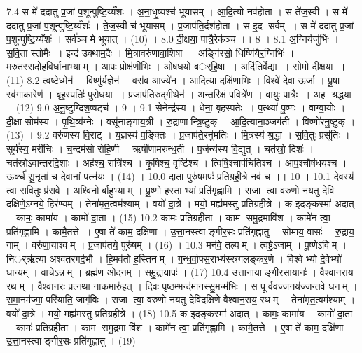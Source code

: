 7.4
स मे॑ ददातु प्र॒जां प॒शून्पुष्टि॒य्यँशः॑ । अ॒ना॒धृ॒ष्यश्च॑ भूयासम् । आ॒दि॒त्यो नव॑होता । स ते॑ज॒स्वी । स मे॑ ददातु प्र॒जां प॒शून्पुष्टि॒य्यँशः॑ । ते॒ज॒स्वी च॑ भूयासम् । प्र॒जाप॑ति॒र्दश॑होता । स इ॒द सर्वम् । स मे॑ ददातु प्र॒जां प॒शून्पुष्टि॒य्यँशः॑ । सर्व॑ञ्च मे भूयात् । (10) ।
8.0
दी॒क्षया॒ पात्रै॒रेक॑ञ्च ।। 8 ।
8.1
अ॒ग्निर्यजु॑र्भिः । स॒वि॒ता स्तोमैः । इन्द्र॑ उक्थाम॒दैः । मि॒त्रावरु॑णावा॒शिषा । अङ्गि॑रसो॒ धिष्णि॑यैर॒ग्निभिः॑ । म॒रुत॑स्सदोहविर्धा॒नाभ्याम् । आपः॒ प्रोक्ष॑णीभिः । ओष॑धयो ब॒र््हि॒षा । अदि॑ति॒र्वेद्या । सोमो॑ दी॒क्षया । (11)
8.2
त्वष्टे॒ध्मेन॑ । विष्णु॑र्य॒ज्ञेन॑ । वस॑व॒ आज्ये॑न । आ॒दि॒त्या दक्षि॑णाभिः । विश्वे॑ दे॒वा ऊ॒र्जा । पू॒षा स्व॑गाका॒रेण॑ । बृह॒स्पतिः॑ पुरो॒धया । प्र॒जाप॑तिरुद्गी॒थेन॑ । अ॒न्तरि॑क्षं प॒वित्रे॑ण । वा॒युः पात्रैः । अ॒ह श्र॒द्धया । (12)
9.0
अ॒नु॒ष्टुग्दिश॒ष्षट्च॑ । 9 ।
9.1
सेनेन्द्र॑स्य । धेना॒ बृह॒स्पतेः । प॒त्थ्या॑ पू॒ष्णः । वाग्वा॒योः । दी॒क्षा सोम॑स्य । पृ॒थि॒व्य॑ग्नेः । वसू॑नाङ्गाय॒त्री । रु॒द्राणान्त्रि॒ष्टुक् । आ॒दि॒त्याना॒ञ्जग॑ती । विष्णो॑रनु॒ष्टुक् । (13) ।
9.2
वरु॑णस्य वि॒राट् । य॒ज्ञस्य॑ प॒ङ्क्तिः । प्र॒जाप॑ते॒रनु॑मतिः । मि॒त्रस्य॑ श्र॒द्धा । स॒वि॒तुः प्रसू॑तिः । सूर्य॑स्य॒ मरी॑चिः । च॒न्द्रम॑सो रोहि॒णी । ऋषी॑णामरुन्ध॒ती । प॒र्जन्य॑स्य वि॒द्युत् । चत॑स्रो॒ दिशः॑ । चत॑स्रोऽवान्तरदि॒शाः । अह॑श्च॒ रात्रि॑श्च । कृ॒षिश्च॒ वृष्टि॑श्च । त्विषि॒श्चाप॑चितिश्च । आप॒श्चौष॑धयश्च । ऊर्क्च॑ सू॒नृता॑ च दे॒वानां॒ पत्न॑यः । (14) ।
10.0
दा॒ता पुरु॑ष॒मपः॑ प्रतिग्रही॒त्रे नव॑ च ।। 10 ।
10.1
दे॒वस्य॑ त्वा सवि॒तुः प्र॑स॒वे । अ॒श्विनोर्बा॒हुभ्याम् । पू॒ष्णो हस्ताभ्यां॒ प्रति॑गृह्णामि । राजा त्वा॒ वरु॑णो नयतु देवि दक्षिणे॒ऽग्नये॒ हिर॑ण्यम् । तेना॑मृत॒त्वम॑श्याम् । वयो॑ दा॒त्रे । मयो॒ मह्य॑मस्तु प्रतिग्रही॒त्रे । क इ॒दङ्कस्मा॑ अदात् । कामः॒ कामा॑य । कामो॑ दा॒ता । (15)
10.2
कामः॑ प्रतिग्रही॒ता । काम॑ समु॒द्रमावि॑श । कामे॑न त्वा॒ प्रति॑गृह्णामि । कामै॒तत्ते । ए॒षा ते॑ काम॒ दक्षि॑णा । उ॒त्ता॒नस्त्वाङ्गीर॒सः प्रति॑गृह्णातु । सोमा॑य॒ वासः॑ । रु॒द्राय॒ गाम् । वरु॑णा॒याश्वम् । प्र॒जाप॑तये॒ पुरु॑षम् । (16) ।
10.3
मन॑वे॒ तल्पम् । त्वष्ट्रे॒ऽजाम् । पू॒ष्णेऽविम् । निर््ऋ॑त्या अश्वतरगर्द॒भौ । हि॒मव॑तो ह॒स्तिनम् । ग॒न्ध॒र्वा॒फ्स॒राभ्य॑स्स्रगलङ्कर॒णे । विश्वेभ्यो दे॒वेभ्यो॑ धा॒न्यम् । वा॒चेऽन्नम् । ब्रह्म॑ण ओद॒नम् । स॒मु॒द्रायापः॑ । (17)
10.4
उ॒त्ता॒नायाङ्गीर॒सायानः॑ । वै॒श्वा॒न॒राय॒ रथम् । वै॒श्वा॒न॒रः प्र॒त्नथा॒ नाक॒मारु॑हत् । दि॒वः पृ॒ष्ठम्भन्द॑मानस्सु॒मन्म॑भिः । स पूर्व॒वज्ज॒नय॑ज्ज॒न्तवे॒ धनम् । स॒मा॒नम॑ज्मा॒ परि॑याति॒ जागृ॑विः । राजा त्वा॒ वरु॑णो नयतु देविदक्षिणे वैश्वान॒राय॒ रथम् । तेना॑मृत॒त्वम॑श्याम् । वयो॑ दा॒त्रे । मयो॒ मह्य॑मस्तु प्रतिग्रही॒त्रे । (18)
10.5
क इ॒दङ्कस्मा॑ अदात् । कामः॒ कामा॑य । कामो॑ दा॒ता । कामः॑ प्रतिग्रही॒ता । काम॑ समु॒द्रमा वि॑श । कामे॑न त्वा॒ प्रति॑गृह्णामि । कामै॒तत्ते । ए॒षा ते॑ काम॒ दक्षि॑णा । उ॒त्ता॒नस्त्वाङ्गीर॒सः प्रति॑गृह्णातु । (19)
